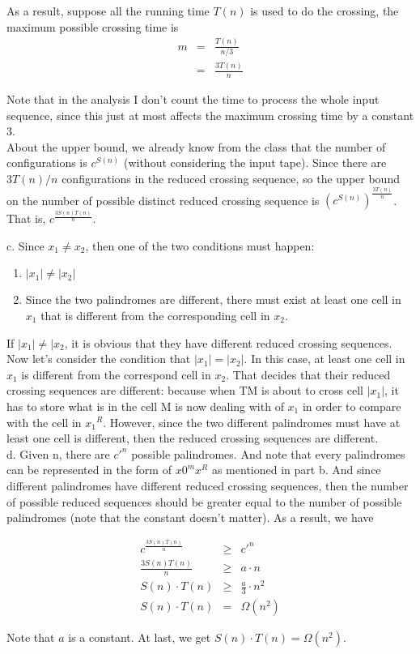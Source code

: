 \documentclass[12pt]{article}
\begin{document}
As a result, suppose all the running time $T(n)$ is used to do the
crossing, the maximum possible crossing time is
\begin{eqnarray*}
  m & = & \frac {T(n)}{n/3} \\
    & = & \frac {3T(n)}{n}
\end{eqnarray*}

Note that in the analysis I don't count the time to process the whole
input sequence, since this just at most affects the maximum crossing
time by a constant 3. \\

About the upper bound, we already know from the class that the number
of configurations is $c^{S(n)}$ (without considering the input
tape). Since there are ${3T(n)}/n$ configurations in the reduced
crossing sequence, so the upper bound on the number of possible
distinct reduced crossing sequence is $(c^{S(n)})^{\frac {3T(n)}{n}}$.
That is, $c^{\frac {3S(n)T(n)}{n}}$.

c. Since $x_1 \neq x_2$, then one of the two conditions must happen:

\begin{enumerate}
\item $|x_1| \neq |x_2|$
\item Since the two palindromes are different, there must exist at
  least one cell in $x_1$ that is different from the corresponding
  cell in $x_2$.
\end{enumerate}

If $|x_1| \neq |x_2$, it is obvious that they have different reduced
crossing sequences. Now let's consider the condition that $|x_1| =
|x_2|$. In this case, at least one cell in $x_1$ is different from the
correspond cell in $x_2$. That decides that their reduced crossing
sequences are different: because when TM is about to cross cell $|x_1|$,
it has to store what is in the cell M is now dealing with of $x_1$ in
order to compare with the cell in ${x_1}^R$. However, since the two
different palindromes must have at least one cell is different, then
the reduced crossing sequences are different.\\

d. Given n, there are ${c'}^n$ possible palindromes. And note that
every palindromes can be represented in the form of $x0^mx^R$ as
mentioned in part b. And since different palindromes have different
reduced crossing sequences, then the number of possible reduced
sequences should be greater equal to the number of possible
palindromes (note that the constant doesn't matter).  As a result, we
have 

\begin{eqnarray*}
c^{\frac {3S(n)T(n)}{n}} & \geq & {c'}^{n} \\
\frac {3S(n)T(n)}{n} & \geq & a \cdot n \\
S(n) \cdot T(n) & \geq & \frac {a}{3} \cdot n^2 \\
S(n) \cdot T(n) & = & \Omega (n^2)
\end{eqnarray*}

Note that $a$ is a constant. At last, we get $S(n) \cdot T(n) = \Omega
(n^2)$.
\end{document}
